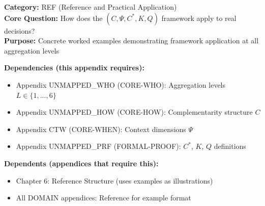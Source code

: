 
\begin{tcolorbox}[colback=gray!5!white, colframe=gray!75!black,
    title=\textbf{Appendix: F REF-EXAMPLES}]

\textbf{Category:} REF (Reference and Practical Application) \\
\textbf{Core Question:} How does the $(C, \Psi, C^*, K, Q)$ framework apply to real decisions? \\
\textbf{Purpose:} Concrete worked examples demonstrating framework application at all aggregation levels

\end{tcolorbox}


\begin{tcolorbox}[colback=yellow!5!white, colframe=yellow!75!black,
    title=\textbf{Cross-Reference Map}]

\textbf{Dependencies (this appendix requires):}
\begin{itemize}[nosep]
    \item Appendix UNMAPPED_WHO (CORE-WHO): Aggregation levels $L \in \{1,...,6\}$
    \item Appendix UNMAPPED_HOW (CORE-HOW): Complementarity structure $C$
    \item Appendix CTW (CORE-WHEN): Context dimensions $\Psi$
    \item Appendix UNMAPPED_PRF (FORMAL-PROOF): $C^*$, $K$, $Q$ definitions
\end{itemize}

\textbf{Dependents (appendices that require this):}
\begin{itemize}[nosep]
    \item Chapter 6: Reference Structure (uses examples as illustrations)
    \item All DOMAIN appendices: Reference for example format
\end{itemize}

\end{tcolorbox}


